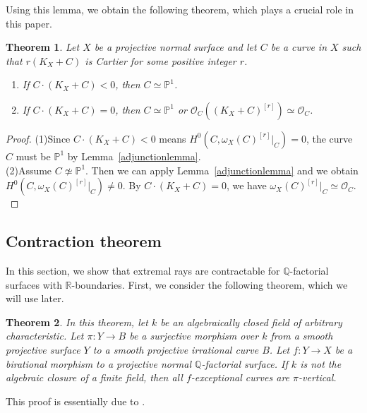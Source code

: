 \documentclass[12pt,twoside]{amsart}
\newtheorem{thm}{Theorem}[section]
\theoremstyle{definition}
\newcommand{\Q}{$\mathbb{Q}$}
\begin{document}
Using this lemma, 
we obtain the following theorem, 
which plays a crucial role in this paper.

\begin{thm}\label{adjunction}
Let $X$ be a projective normal surface and 
let $C$ be a curve in $X$ 
such that $r(K_X+C)$ is Cartier for some positive integer $r$. 
\begin{enumerate}
\item{If $C\cdot (K_X+C)<0$, then $C\simeq \mathbb{P}^1$.}
\item{If $C\cdot (K_X+C)=0$, then $C\simeq \mathbb{P}^1$ or 
$\mathcal{O}_C((K_X+C)^{[r]}) \simeq \mathcal O_C$.}
\end{enumerate}
\end{thm}

\begin{proof}
(1)Since $C\cdot (K_X+C)<0$ means $H^0(C, \omega_X(C)^{[r]}|_C)=0$, 
the curve $C$ must be $\mathbb{P}^1$ by Lemma~\ref{adjunctionlemma}. \\
(2)Assume $C\not\simeq \mathbb{P}^1$. 
Then we can apply Lemma~\ref{adjunctionlemma} and 
we obtain $H^0(C, \omega_X(C)^{[r]}|_C) \neq 0.$ 
By $C\cdot (K_X+C)=0$, we have $\omega_X(C)^{[r]}|_C\simeq \mathcal O_C.$
\end{proof}



\subsection{Contraction theorem}
In this section, we show that 
extremal rays are contractable for \Q-factorial surfaces 
with $\mathbb{R}$-boundaries. 
First, we consider the following theorem, 
which we will use later. 


\begin{thm}\label{irratqfac}
In this theorem, let $k$ be an algebraically closed field of arbitrary characteristic. 
Let $\pi:Y \to B$ be a surjective morphism over $k$ 
from a smooth projective surface $Y$ 
to a smooth projective irrational curve $B$. 
Let $f:Y \to X$ be a birational morphism 
to a projective normal \Q-factorial surface. 
If $k$ is not the algebraic closure of a finite field, then 
all $f$-exceptional curves are $\pi$-vertical. 
\end{thm}

This proof is essentially due to \cite[Lemma~5.2]{Fujino}. 
\end{document}
